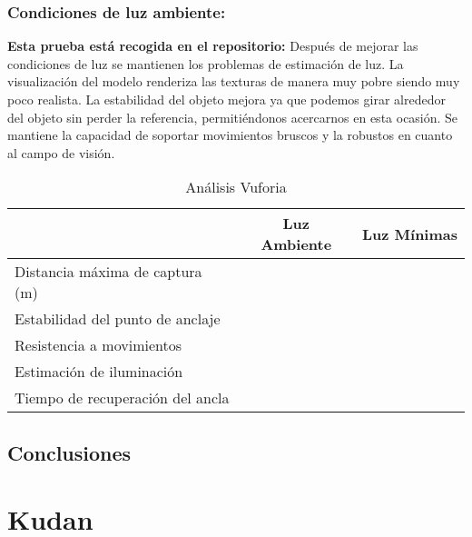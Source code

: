 \subsubsection{Condiciones de luz ambiente:\\}

\textbf{Esta prueba está recogida en el repositorio:}
Después de mejorar las condiciones de luz se mantienen los problemas de estimación de luz. La visualización del modelo renderiza las texturas de manera muy pobre siendo muy poco realista. La estabilidad del objeto mejora ya que podemos girar alrededor del objeto sin perder la referencia, permitiéndonos acercarnos en esta ocasión. Se mantiene la capacidad de soportar movimientos bruscos y la robustos en cuanto al campo de visión.

\begin{table}[H]
    \centering
    \begin{tabular}{|l|c|c|}
    \hline
          & Luz Ambiente & Luz Mínimas \\
         \hline
        Distancia máxima de captura (m)  & &\\
        \hline
        Estabilidad del punto de anclaje  & &\\
        \hline
        Resistencia a movimientos  & & \\
        \hline
        Estimación de iluminación  & & \\
        \hline
        Tiempo de recuperación del ancla  & & \\
      \hline
    \end{tabular}
    \caption{Análisis Vuforia}
    \label{tab:TVuforia}
\end{table}
\subsection{Conclusiones}

\clearpage
\section{Kudan}
